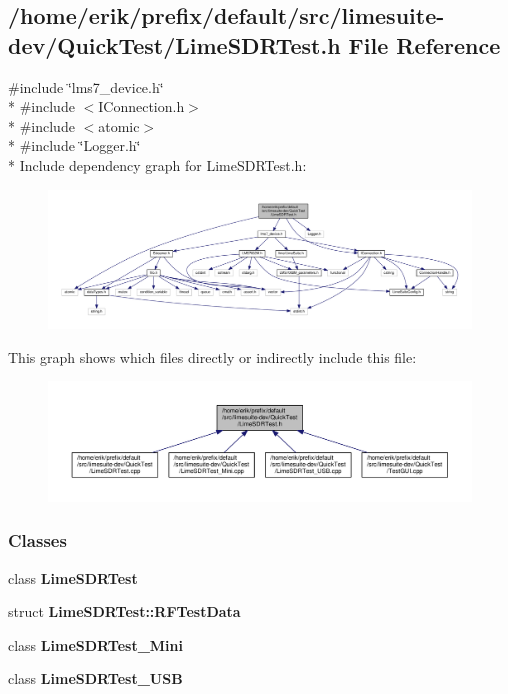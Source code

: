 \subsection{/home/erik/prefix/default/src/limesuite-\/dev/\+Quick\+Test/\+Lime\+S\+D\+R\+Test.h File Reference}
\label{LimeSDRTest_8h}
{\ttfamily \#include \char`\"{}lms7\+\_\+device.\+h\char`\"{}}\\*
{\ttfamily \#include $<$I\+Connection.\+h$>$}\\*
{\ttfamily \#include $<$atomic$>$}\\*
{\ttfamily \#include \char`\"{}Logger.\+h\char`\"{}}\\*
Include dependency graph for Lime\+S\+D\+R\+Test.\+h\+:
\nopagebreak
\begin{figure}[H]
\begin{center}
\leavevmode
\includegraphics[width=350pt]{d5/dc8/LimeSDRTest_8h__incl}
\end{center}
\end{figure}
This graph shows which files directly or indirectly include this file\+:
\nopagebreak
\begin{figure}[H]
\begin{center}
\leavevmode
\includegraphics[width=350pt]{db/dfd/LimeSDRTest_8h__dep__incl}
\end{center}
\end{figure}
\subsubsection*{Classes}
\begin{DoxyCompactItemize}
\item 
class {\bf Lime\+S\+D\+R\+Test}
\item 
struct {\bf Lime\+S\+D\+R\+Test\+::\+R\+F\+Test\+Data}
\item 
class {\bf Lime\+S\+D\+R\+Test\+\_\+\+Mini}
\item 
class {\bf Lime\+S\+D\+R\+Test\+\_\+\+U\+SB}
\end{DoxyCompactItemize}

